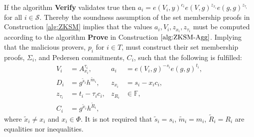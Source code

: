 If the algorithm \textbf{Verify} validates true then $a_i=e(V_i,y)^{c_i}e(V,g)^{z_{x_i}}e(g,g)^{z_{\tau_i}}$ for all $i\in\mathcal{S}$. Thereby the soundness assumption of the set membership proofs in Construction \ref{alg:ZKSM} implies that the values $a_i,V_i,z_{x_i},z_{\tau_i}$ must be computed according to the algorithm \textbf{Prove} in Construction $\ref{alg:ZKSM-Agg}$.
Implying that the malicious provers, $p_i$ for $i\in T$, must construct their set membership proofs, $\Sigma_i$, and Pedersen commitments, $C_i$, such that the following is fulfilled:
\begin{align*}
V_i &= A_{x_i}^{\tau_i}, 				  		&a_i& = e(V_i,g)^{-s_i}e(g,g)^{t_i}, 		\\
D_i &= g^{\tilde{s}_i}h^{\tilde{m}_i},		&z_{x_i}& = s_i-x_ic_i,							\\
z_{\tau_i} &= t_i- \tau_i c_i, 					&z_{R_i}&\in \mathds{F},					\\
C_i &= g^{\tilde{x}_i}h^{\tilde{R}_i},
\end{align*}
where $\tilde{x}_i\neq x_i$ and $x_i\in\Phi$. It is not required that $\tilde{s}_i =s_i$, $\tilde{m}_i =m_i$, $\tilde{R}_i =R_i$ are equalities nor inequalities.

